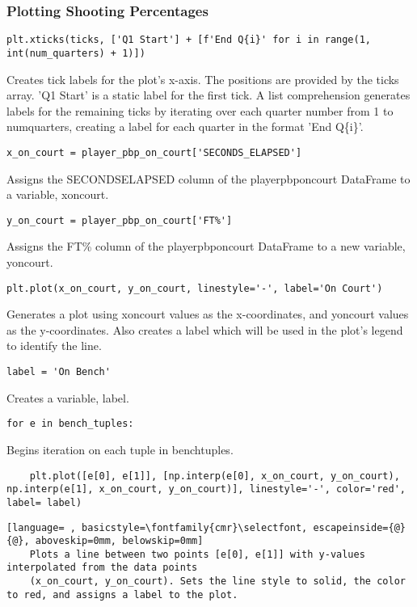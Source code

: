 \documentclass{article}
\begin{document}
\subsubsection{Plotting Shooting Percentages}
\begin{lstlisting}
plt.xticks(ticks, ['Q1 Start'] + [f'End Q{i}' for i in range(1, int(num_quarters) + 1)])
\end{lstlisting}
Creates tick labels for the plot's x-axis. The positions are provided by the ticks array. 'Q1 Start' is a static label for the first tick. A list comprehension generates labels for the remaining ticks by iterating over each quarter number from 1 to num\textunderscore quarters, creating a label for each quarter in the format 'End Q\{i\}'.
\begin{lstlisting}
x_on_court = player_pbp_on_court['SECONDS_ELAPSED']
\end{lstlisting}
Assigns the SECONDS\textunderscore ELAPSED column of the player\textunderscore pbp\textunderscore on\textunderscore court DataFrame to a variable, x\textunderscore on\textunderscore court.
\begin{lstlisting}
y_on_court = player_pbp_on_court['FT%']
\end{lstlisting}
Assigns the FT\% column of the player\textunderscore pbp\textunderscore on\textunderscore court DataFrame to a new variable, y\textunderscore on\textunderscore court.
\begin{lstlisting}
plt.plot(x_on_court, y_on_court, linestyle='-', label='On Court')
\end{lstlisting}
Generates a plot using x\textunderscore on\textunderscore court values as the x-coordinates, and y\textunderscore on\textunderscore court values as the y-coordinates. Also creates a label which will be used in the plot's legend to identify the line.
\begin{lstlisting}
label = 'On Bench'
\end{lstlisting}
Creates a variable, label.
\begin{lstlisting}
for e in bench_tuples:
\end{lstlisting}
Begins iteration on each tuple in bench\textunderscore tuples.
\begin{lstlisting}
    plt.plot([e[0], e[1]], [np.interp(e[0], x_on_court, y_on_court), np.interp(e[1], x_on_court, y_on_court)], linestyle='-', color='red', label= label)
\end{lstlisting}
\begin{lstlisting}[language= , basicstyle=\fontfamily{cmr}\selectfont, escapeinside={@}{@}, aboveskip=0mm, belowskip=0mm]
    Plots a line between two points [e[0], e[1]] with y-values interpolated from the data points
    (x_on_court, y_on_court). Sets the line style to solid, the color to red, and assigns a label to the plot.
\end{lstlisting}
\end{document}
